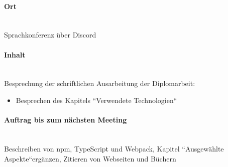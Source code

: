 \paragraph{Ort}\mbox{}\\
Sprachkonferenz über Discord

\paragraph{Inhalt}\mbox{}\\
Besprechung der schriftlichen Ausarbeitung der Diplomarbeit:
\begin{itemize}
	\item Besprechen des Kapitels ``Verwendete Technologien``
\end{itemize}

\paragraph{Auftrag bis zum nächsten Meeting}\mbox{}\\
Beschreiben von npm, TypeScript und Webpack, Kapitel ``Ausgewählte Aspekte``ergänzen, Zitieren von Webseiten und Büchern